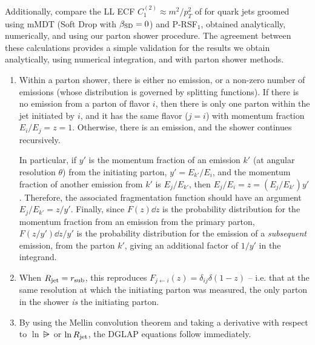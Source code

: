 Additionally,  compare the LL ECF \(C_1^{(2)} \approx m^2 / p_T^2\) of  for quark jets groomed using mMDT (Soft Drop with \(\beta_{\rm SD} = 0\)) and P-RSF\(_1\), obtained analytically, numerically, and using our parton shower procedure.
%
The agreement between these calculations provides a simple validation for the results we obtain analytically, using numerical integration, and with parton shower methods.





\begin{enumerate}[label=\alph*)]
    \item
    Within a parton shower, there is either no emission, or a non-zero number of emissions (whose distribution is governed by splitting functions).
    If there is no emission from a parton of flavor \(i\), then there is only one parton within the jet initiated by \(i\), and it has the same flavor (\(j = i\)) with momentum fraction \(E_i / E_j = z = 1\).
    Otherwise, there is an emission, and the shower continues recursively.

    In particular, if \(y'\) is the momentum fraction of an emission \(k'\) (at angular resolution \(\theta\)) from the initiating parton, \(y' = E_{k'} / E_i\), and the momentum fraction of another emission from \(k'\) is \(E_j / E_{k'}\), then \(E_j / E_i = z = (E_j / E_{k'}) y'\).
    Therefore, the associated fragmentation function should have an argument \(E_j / E_{k'} = z / y'\).
    Finally, since \(F(z) \dd z\) is the probability distribution for the momentum fraction from an emission from the primary parton, \(F(z/y') \dd z / y'\) is the probability distribution for the emission of a \textit{subsequent} emission, from the parton \(k'\), giving an additional factor of \(1/y'\) in the integrand.


    \item
    When \(R_\text{jet} = r_\text{sub}\), this reproduces \(F_{j\leftarrow i}(z) = \delta_{ij} \delta(1-z)\) -- i.e. that at the same resolution \Rjet{} at which the initiating parton was measured, the only parton in the shower \textit{is} the initiating parton.

    \item
    By using the Mellin convolution theorem and taking a derivative with respect to \(\ln \rsub\) or \(\ln R_\text{jet}\), the DGLAP equations follow immediately.
\end{enumerate}



